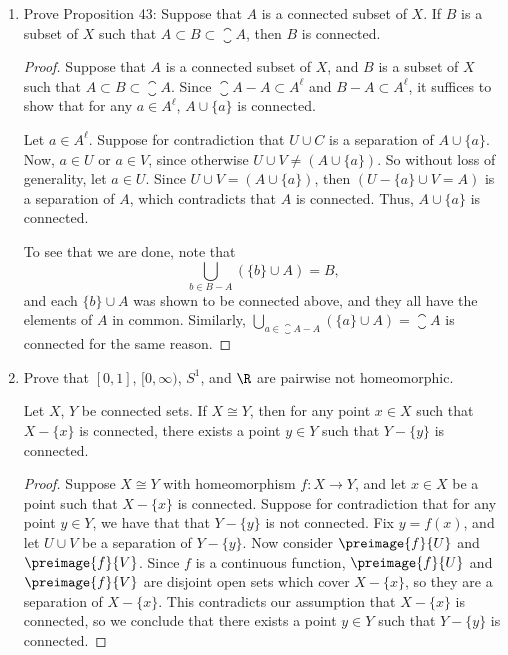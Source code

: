 \documentclass[letterpaper]{article}
\begin{document}
\begin{enumerate}
\pagebreak
\item Prove Proposition 43: Suppose that $A$ is a connected subset of $X$. If $B$ is a subset of $X$ such that $A\subset B\subset \closure{A}$, then $B$ is connected. 
\begin{proof}
Suppose that $A$ is a connected subset of $X$, and $B$ is a subset of $X$ such that $A\subset B\subset \closure{A}$. Since $\closure{A}-A\subset A^\ell$ and $B-A\subset A^\ell$, it suffices to show that for any $a\in A^\ell$, $A\cup\{a\}$ is connected. 

Let $a\in A^\ell$. Suppose for contradiction that $U\cup C$ is a separation of $A\cup\{a\}$. Now, $a\in U$ or $a\in V$, since otherwise $U\cup V \neq (A\cup\{a\})$. So without loss of generality, let $a\in U$. Since $U\cup V = (A\cup\{a\})$, then $(U-\{a\}\cup V = A)$ is a separation of $A$, which contradicts that $A$ is connected. Thus, $A\cup\{a\}$ is connected. 

To see that we are done, note that 
$$\bigcup_{b\in B-A}(\{b\} \cup A) = B,$$
and each $\{b\} \cup A$ was shown to be connected above, and they all have the elements of $A$ in common. Similarly, $\bigcup_{a\in \closure{A}-A}(\{a\} \cup A) = \closure{A}$ is connected for the same reason. 
\end{proof}

\item Prove that $[0,1]$, $[0,\infty)$, $S^1$, and $\R$ are pairwise not homeomorphic. 

\begin{lemma*}
Let $X$, $Y$ be connected sets. If $X\cong Y$, then for any point $x\in X$ such that $X-\{x\}$ is connected, there exists a point $y\in Y$ such that $Y-\{y\}$ is connected. 
\end{lemma*}
\begin{proof} Suppose $X\cong Y$ with homeomorphism $f:X\to Y$, and let $x\in X$ be a point such that $X-\{x\}$ is connected. Suppose for contradiction that for any point $y\in Y$, we have that that $Y-\{y\}$ is not connected. Fix $y=f(x)$, and let $U\cup V$ be a separation of $Y-\{y\}$. Now consider $\preimage{f}{U}$ and $\preimage{f}{V}$. Since $f$ is a continuous function, $\preimage{f}{U}$ and $\preimage{f}{V}$ are disjoint open sets which cover $X-\{x\}$, so they are a separation of $X-\{x\}$. This contradicts our assumption that $X-\{x\}$ is connected, so we conclude that there exists a point $y\in Y$ such that $Y-\{y\}$ is connected.
\end{proof}


\end{enumerate}
\end{document}
